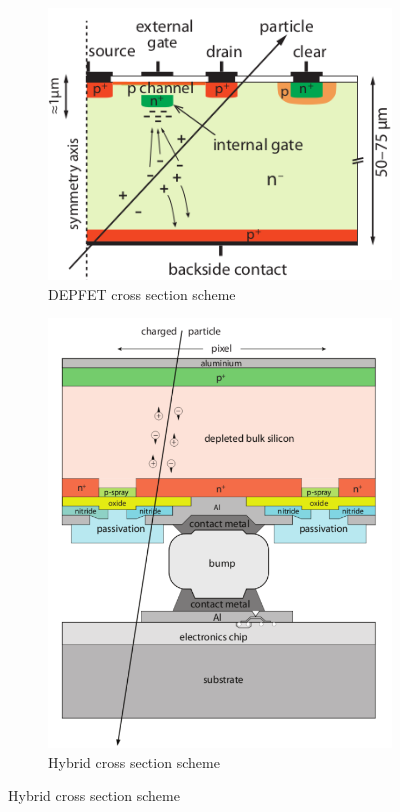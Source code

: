    \begin{figure}
      \centering
      \begin{subfigure}[b]{0.49\textwidth}
          \centering
          \includegraphics[width=\linewidth]{figures/Pixel_detectors/DEPFET_scheme.png}
          \caption{DEPFET cross section scheme}
          \label{fig:DEPFET_scheme}
      \end{subfigure}
      \hfill
      \begin{subfigure}[b]{0.49\textwidth}
          \centering
          \includegraphics[width=\linewidth]{figures/Pixel_detectors/hybrid_scheme.png} 
          \caption{Hybrid cross section scheme}
          \label{fig:hybrid_scheme}
      \end{subfigure}
   \end{figure}

